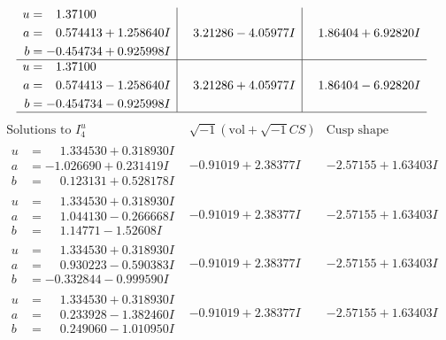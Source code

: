 \documentclass[1p]{elsarticle_modified}
\theoremstyle{definition}
\newcommand{\I}{\sqrt{-1}}
\begin{document}
$$\begin{array}{c|c|c}
\begin{aligned}
u &= \phantom{-}1.37100\phantom{ +0.000000I} \\
a &= \phantom{-}0.574413 + 1.258640 I \\
b &= -0.454734 + 0.925998 I\end{aligned}
 & \phantom{-}3.21286 - 4.05977 I & \phantom{-}1.86404 + 6.92820 I \\ \hline\begin{aligned}
u &= \phantom{-}1.37100\phantom{ +0.000000I} \\
a &= \phantom{-}0.574413 - 1.258640 I \\
b &= -0.454734 - 0.925998 I\end{aligned}
 & \phantom{-}3.21286 + 4.05977 I & \phantom{-}1.86404 - 6.92820 I\\
 \hline 
 \end{array}$$\newpage$$\begin{array}{c|c|c}  
\text{Solutions to }I^u_{4}& \I (\text{vol} + \sqrt{-1}CS) & \text{Cusp shape}\\
 \hline 
\begin{aligned}
u &= \phantom{-}1.334530 + 0.318930 I \\
a &= -1.026690 + 0.231419 I \\
b &= \phantom{-}0.123131 + 0.528178 I\end{aligned}
 & -0.91019 + 2.38377 I & -2.57155 + 1.63403 I \\ \hline\begin{aligned}
u &= \phantom{-}1.334530 + 0.318930 I \\
a &= \phantom{-}1.044130 - 0.266668 I \\
b &= \phantom{-}1.14771 - 1.52608 I\end{aligned}
 & -0.91019 + 2.38377 I & -2.57155 + 1.63403 I \\ \hline\begin{aligned}
u &= \phantom{-}1.334530 + 0.318930 I \\
a &= \phantom{-}0.930223 - 0.590383 I \\
b &= -0.332844 - 0.999590 I\end{aligned}
 & -0.91019 + 2.38377 I & -2.57155 + 1.63403 I \\ \hline\begin{aligned}
u &= \phantom{-}1.334530 + 0.318930 I \\
a &= \phantom{-}0.233928 - 1.382460 I \\
b &= \phantom{-}0.249060 - 1.010950 I\end{aligned}
 & -0.91019 + 2.38377 I & -2.57155 + 1.63403 I \\ \hline\begin{aligned}

\end{aligned}
\end{array}$$
\end{document}
